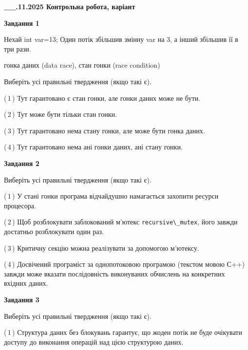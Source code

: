 \documentclass[12pt, ukrainian]{article}
\def\code#1{\Verb!#1!}
\begin{document}
\begin {large}

\textbf{\_\_.11.2025 Контрольна робота, варіант  }\par


{

\begin{center}
\textbf{Завдання 1}
\end{center}
Нехай int var=13; Один потік збільшив змінну var на 3, а інший збільшив її в три рази.

гонка даних (data race), стан гонки (race condition)

Виберіть усі правильні твердження (якщо такі є).\par
\vspace{2mm}
(\,1\,) Тут гарантовано є стан гонки, але гонки даних може не бути.%

(\,2\,) Тут може бути тільки стан гонки.%

(\,3\,) Тут гарантовано нема стану гонки, але може бути гонка даних.%

(\,4\,) Тут гарантовано нема ані гонки даних, ані стану гонки.%



\begin{center}
\textbf{Завдання 2}
\end{center}
Виберіть усі правильні твердження (якщо такі є).\par
\vspace{2mm}

(\,1\,) У стані гонки програма відчайдушно намагається захопити ресурси процесора.%

(\,2\,) Щоб розблокувати заблокований м’ютекс \code{recursive\_mutex}, його завжди достатньо розблокувати один раз.%

(\,3\,) Критичну секцію можна реалізувати за допомогою м’ютексу.%

(\,4\,) Досвічений програміст за однопотоковою програмою (текстом мовою С++) завжди може вказати послідовність виконуваних обчислень на конкретних вхідних даних.%



\begin{center}
\textbf{Завдання 3}
\end{center}
Виберіть усі правильні твердження (якщо такі є).\par
\vspace{2mm}

(\,1\,) Структура даних без блокувань гарантує, що жоден потік не буде очікувати доступу до виконання операцій над цією структурою даних.%

}
\end{large}
\end{document}
